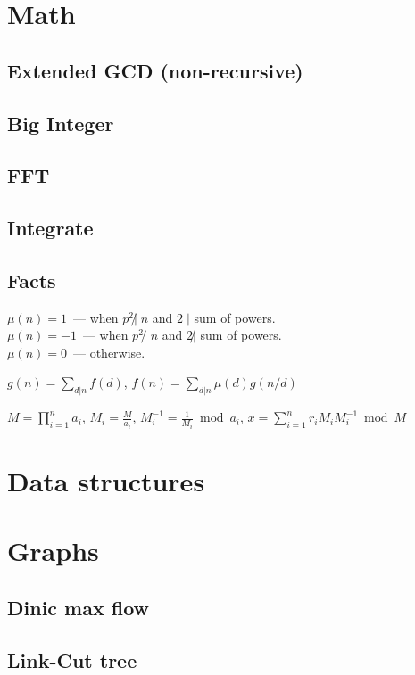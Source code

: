 \documentclass[10pt]{article}
\begin{document}
\pagestyle{fancy}
\newpage

\section{Math}
\subsection{Extended GCD (non-recursive)}

\subsection{Big Integer}

\subsection{FFT}

\subsection{Integrate}

\subsection{Facts}
$\mu(n) = 1$~--- when $p^2 \not| \;n$ and $2 \;|$ sum of powers.\\
$\mu(n) = -1$~--- when $p^2 \not| \;n$ and $2 \not|$ sum of powers.\\
$\mu(n) = 0$~--- otherwise.

$g(n) = \sum_{d | n}f(d)$, $f(n) = \sum_{d | n}\mu(d)g(n/d)$

$M={\displaystyle \prod _{{i=1}}^{n}a_{i}}$,
$M_{i}={\frac  M{a_{i}}}$,
$M_{i}^{{-1}}={\frac  1{M_{i}}}{\bmod  {a_{i}}}$,
$x=\sum_{i=1}^{n}r_{i}M_{i}M_{i}^{-1}\bmod M$

\section{Data structures}

\section{Graphs}
\subsection{Dinic max flow}

\subsection{Link-Cut tree}

\end{document}
